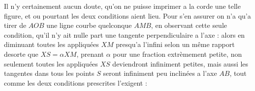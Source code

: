 \documentclass[11pt,a4paper]{article}
\begin{document}
Il n'y certainement aucun doute, qu'on ne puisse imprimer a la corde
une telle figure, et ou pourtant les deux conditions aient lieu. Pour s'en
assurer on n'a qu'a tirer de $AOB$ une ligne courbe quelconque $AMB$,
en observant cette seule condition, qu'il n'y ait nulle part une tangente
perpendiculaire a l'axe : alors en diminuant toutes les appliquées $XM$
presqu'a l'infini selon un même rapport desorte que $XS=\alpha XM$,
prenant $\alpha$ pour une fraction extrèmement petite, non seulement toutes les
appliquées $XS$ deviendront infiniment petites, mais aussi les tangentes dans tous les points
$S$ seront infiniment peu inclinées a l'axe $AB$, tout comme les deux conditions prescrites l'exigent :
\end{document}
